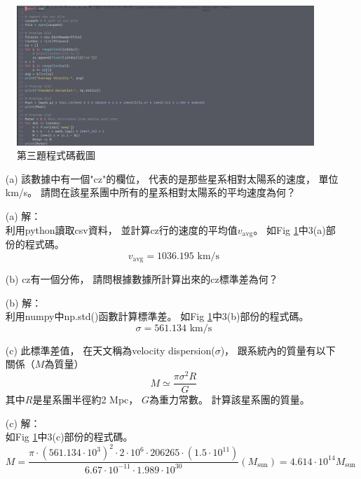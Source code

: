 \documentclass{article}
\theoremstyle{definition}
\begin{document}
\begin{enumerate}
		\begin{figure}[h]
			\centering
			\includegraphics[scale = 0.25]{hw2-3.png}
			\caption{第三題程式碼截圖}
			\label{fig3}
		\end{figure}


		\begin{enumerate}
			\item[(a)] 該數據中有一個"cz"的欄位，
				代表的是那些星系相對太陽系的速度，
				單位km/s。
				請問在該星系團中所有的星系相對太陽系的平均速度為何？

			\item[(a)] 解：\\
				利用python讀取csv資料，
				並計算cz行的速度的平均值$v_{\text{avg}}$。
				如Fig \ref{fig3}中3(a)部份的程式碼。
				\[
					v_{\text{avg}} = 1036.195 \text{ km/s}
				\]

			\item[(b)] cz有一個分佈，
				請問根據數據所計算出來的cz標準差為何？

			\item[(b)] 解：\\
				利用numpy中np.std()函數計算標準差。
				如Fig \ref{fig3}中3(b)部份的程式碼。
				\[
					\sigma = 561.134 \text{ km/s}
				\]

			\item[(c)] 此標準差值，
				在天文稱為velocity dispersion($\sigma$)，
				跟系統內的質量有以下關係（$M$為質量）
				\[
					M \simeq \frac{\pi \sigma^2 R}{G}
				\]
				其中$R$是星系團半徑約2 Mpc，
				$G$為重力常數。
				計算該星系團的質量。

			\item[(c)] 解：\\
				如Fig \ref{fig3}中3(c)部份的程式碼。
				\[
					M = \frac{\pi \cdot (561.134 \cdot 10^3)^2 \cdot 2 \cdot 10^6 \cdot 206265 \cdot (1.5 \cdot 10^{11})}{6.67 \cdot 10^{-11} \cdot 1.989 \cdot 10^{30}} (M_{\text{sun}}) = 4.614 \cdot 10^{14} M_{\text{sun}}
				\]


\end{enumerate}
\end{enumerate}
\end{document}
